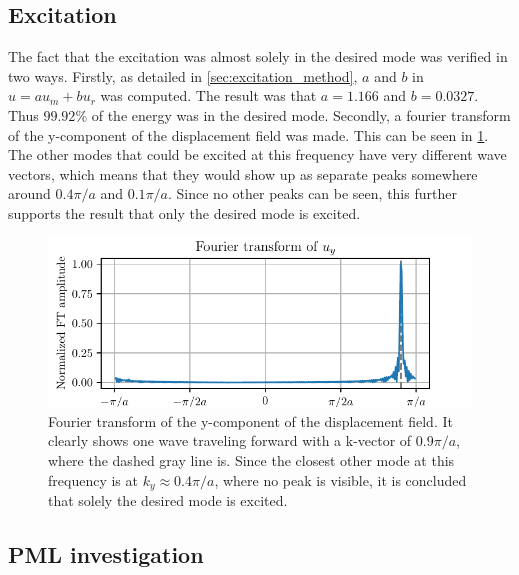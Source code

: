 \subsection{Excitation}

The fact that the excitation was almost solely in the desired mode was verified
in two ways.
Firstly, as detailed in \cref{sec:excitation_method}, $a$ and $b$ in $u = a u_m
+ b u_r$ was computed.
The result was that $a = 1.166$ and $b = 0.0327$.
Thus $99.92\%$ of the energy was in the desired mode.
Secondly, a fourier transform of the y-component of the displacement field was
made.
This can be seen in \cref{fig:v_ft}.
The other modes that could be excited at this frequency have very different wave
vectors, which means that they would show up as separate peaks somewhere around
$0.4 \pi / a$ and $0.1 \pi / a$.
Since no other peaks can be seen, this further supports the result that only the
desired mode is excited.

\begin{figure}[htpb]
	\centering
	\includegraphics{chapters/results/ft_figure.pdf}
	\caption{%
		Fourier transform of the y-component of the displacement field.
		It clearly shows one wave traveling forward with a k-vector of
		$0.9 \pi / a$, where the dashed gray line is.
		Since the closest other mode at this frequency is at
		$k_y \approx 0.4 \pi / a$, where no peak is visible, it is concluded
		that solely the desired mode is excited.
	}%
	\label{fig:v_ft}
\end{figure}

\subsection{PML investigation}

